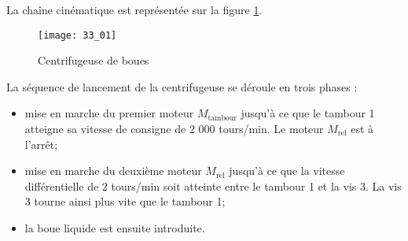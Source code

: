 \normaltrue \difficilefalse \tdifficilefalse
\correctiontrue


\setcounter{question}{0}

\ifcorrection
\else
{}
\fi

\ifprof
\else

La chaîne cinématique est représentée sur la figure
\ref{fig:TEC:04:Jeq:33}.
\begin{figure}[!h]
\centering
\texttt{[image: 33\_01]}
\caption{\label{fig:TEC:04:Jeq:33} Centrifugeuse de boues}
\end{figure}


La séquence de lancement de la centrifugeuse se déroule en trois phases :
\begin{itemize}
\item mise en marche du premier moteur $M_{\text{tambour}}$ jusqu’à ce que le tambour 1 atteigne sa vitesse
de consigne de 2 000 tours/min. Le moteur $M_{\text{rel}}$ est à l’arrêt;
\item mise en marche du deuxième moteur $M_{\text{rel}}$ jusqu’à ce que la vitesse différentielle de
2 tours/min soit atteinte entre le tambour 1 et la vis 3. La vis 3 tourne ainsi plus vite que le
tambour 1;
\item la boue liquide est ensuite introduite.
\end{itemize}
\fi


\ifprof
\else
\fi

\ifprof
\else

\fi
\ifprof
\else


\fi
